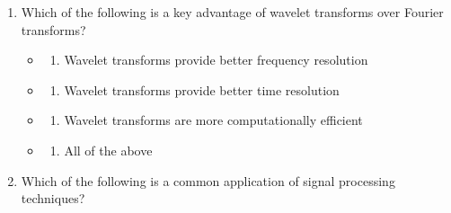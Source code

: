 \documentclass[
  letterpaper,
  DIV=11,
  numbers=noendperiod]{scrartcl}
\providecommand{\tightlist}{%
  \setlength{\itemsep}{0pt}\setlength{\parskip}{0pt}}\usepackage{longtable,booktabs,array}
\begin{document}
\begin{enumerate}
\def\labelenumi{\arabic{enumi}.}
\tightlist
\item
  Which of the following is a key advantage of wavelet transforms over
  Fourier transforms?

  \begin{itemize}
  \tightlist
  \item
    \begin{enumerate}
    \def\labelenumii{\alph{enumii})}
    \tightlist
    \item
      Wavelet transforms provide better frequency resolution
    \end{enumerate}
  \item
    \begin{enumerate}
    \def\labelenumii{\alph{enumii})}
    \setcounter{enumii}{1}
    \tightlist
    \item
      Wavelet transforms provide better time resolution
    \end{enumerate}
  \item
    \begin{enumerate}
    \def\labelenumii{\alph{enumii})}
    \setcounter{enumii}{2}
    \tightlist
    \item
      Wavelet transforms are more computationally efficient
    \end{enumerate}
  \item
    \begin{enumerate}
    \def\labelenumii{\alph{enumii})}
    \setcounter{enumii}{3}
    \tightlist
    \item
      All of the above
    \end{enumerate}
  \end{itemize}
\item
  Which of the following is a common application of signal processing
  techniques?


\end{enumerate}
\end{document}
